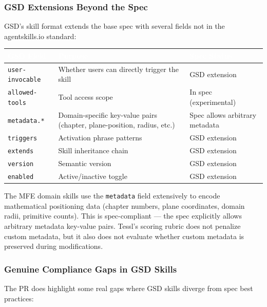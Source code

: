 \documentclass[11pt,letterpaper]{article}
\newcommand{\tableheader}[1]{\textbf{\sffamily\textcolor{white}{#1}}}
\begin{document}
\subsubsection{GSD Extensions Beyond the Spec}

GSD's skill format extends the base spec with several fields not in the agentskills.io standard:

\begin{center}
\begin{tabularx}{\textwidth}{L{3.5cm}XL{2.5cm}}
\toprule
{}
\tableheader{GSD Field} & \tableheader{Purpose} & \tableheader{Spec Status} \\
\midrule
\texttt{user-invocable} & Whether users can directly trigger the skill & GSD extension \\
\texttt{allowed-tools} & Tool access scope & In spec (experimental) \\
\texttt{metadata.*} & Domain-specific key-value pairs (chapter, plane-position, radius, etc.) & Spec allows arbitrary metadata \\
\texttt{triggers} & Activation phrase patterns & GSD extension \\
\texttt{extends} & Skill inheritance chain & GSD extension \\
\texttt{version} & Semantic version & GSD extension \\
\texttt{enabled} & Active/inactive toggle & GSD extension \\
\bottomrule
\end{tabularx}
\end{center}

The MFE domain skills use the \texttt{metadata} field extensively to encode mathematical positioning data (chapter numbers, plane coordinates, domain radii, primitive counts). This is spec-compliant --- the spec explicitly allows arbitrary metadata key-value pairs. Tessl's scoring rubric does not penalize custom metadata, but it also does not evaluate whether custom metadata is preserved during modifications.

\subsubsection{Genuine Compliance Gaps in GSD Skills}

The PR does highlight some real gaps where GSD skills diverge from spec best practices:
\end{document}
